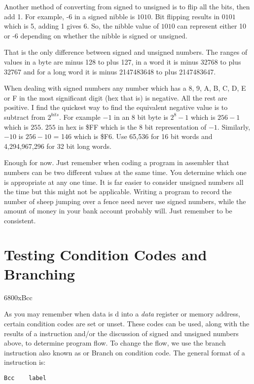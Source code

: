 Another method of converting from signed to unsigned is to flip all the bits, then add 1. For 
    example, -6 in a signed nibble is $1010$. Bit flipping results in $0101$ which is 5, 
    adding 1 gives 6. So, the nibble value of $1010$ can represent either 10 or -6 depending 
    on whether the nibble is signed or unsigned.

That is the only difference between signed and unsigned numbers. The
    ranges of values in a byte are minus 128 to plus 127, in a word it is
    minus 32768 to plus 32767 and for a long word it is minus 2147483648 to
    plus 2147483647.

When dealing with signed numbers any number which has a 8, 9, A, B,
    C, D, E or F in the most significant digit (hex that is) is negative. All
    the rest are positive. I find the quickest way to find the equivalent
    negative value is to subtract from $2^{bits}$. For example $-1$ in an 8 bit byte is $2^{8}-1$ which is $256 -1$ which is $255$. $255$ in hex is \$FF which is
    the 8 bit representation of $-1$. Similarly, $-10$ is $256 -10$ = 146 which is
    \$F6. Use 65,536 for 16 bit words and 4,294,967,296 for 32 bit long words.

Enough for now. Just remember when coding a program in assembler
    that numbers can be two different values at the same time. You determine
    which one is appropriate at any one time. It is far easier to consider
    unsigned numbers all the time but this might not be applicable. Writing a
    program to record the number of sheep jumping over a fence need never use
    signed numbers, while the amount of money in your bank account probably
    will. Just remember to be consistent.

\section{Testing Condition Codes and Branching}\mc6800x{Bcc}
\label{ch2-testing-branching}%

As you may remember when data is d into a \emph{data} register or
memory address, certain condition codes are set or unset. These codes can be used, along
with the results of a  instruction and/or the discussion of signed and unsigned numbers
above, to determine program flow. To change the flow, we use the branch instruction also
known as  or Branch on condition code. The general format of a  instruction
is:

\begin{lstlisting}[firstnumber=1,]
          Bcc    label 
\end{lstlisting}

